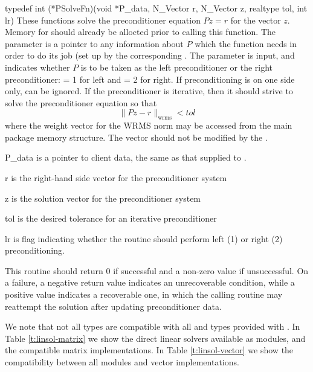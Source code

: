 {
  typedef int (*PSolveFn)(void *P\_data, N\_Vector r, N\_Vector z, realtype tol, int lr)
}
{
  These functions solve the preconditioner equation $Pz = r$
  for the vector $z$.  Memory for  should already be
  allocted prior to calling this function.  The
  parameter  is a pointer to any information about $P$
  which the function needs in order to do its job (set up by the
  corresponding . The parameter  is input, and
  indicates whether $P$ is to be taken as the left preconditioner or
  the right preconditioner:  = 1 for left and  = 2 for
  right.  If preconditioning is on one side only,  can be
  ignored.  If the preconditioner is iterative, then it should strive
  to solve the preconditioner equation so that 
  \[
      \| Pz - r \|_{\text{wrms}} < tol
  \]
  where the weight vector for the WRMS norm may be accessed from the
  main package memory structure.  The vector  should not be
  modified by the .  
}
{
  \begin{args}
  \item[P\_data]
    is a pointer to client data, the same as that supplied to .
  \item[r]
    is the right-hand side vector for the preconditioner system
  \item[z]
    is the solution vector for the preconditioner system
  \item[tol]
    is the desired tolerance for an iterative preconditioner
  \item[lr]
    is flag indicating whether the routine should perform left (1) or
    right (2) preconditioning.
  \end{args}
}
{  
  This routine should return 0 if successful and a non-zero value if
  unsuccessful.  On a failure, a negative return value indicates an
  unrecoverable condition, while a positive value indicates a
  recoverable one, in which the calling routine may reattempt the
  solution after updating preconditioner data.
}
{
}



We note that not all {\sunlinsol} types are compatible with all
{\sunmatrix} and {\nvector} types provided with {\sundials}.  In Table 
\ref{t:linsol-matrix} we show the direct linear solvers
available as {\sunlinsol} modules, and the compatible matrix
implementations.  In Table \ref{t:linsol-vector} we show the
compatibility between all {\sunlinsol} modules and vector
implementations.

